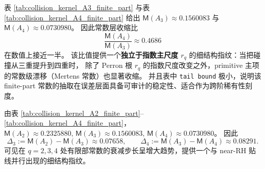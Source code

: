

\begin{remark}\label{rem:pom-collision-mertens-halving}
表 \ref{tab:collision_kernel_A3_finite_part} 与表 \ref{tab:collision_kernel_A4_finite_part} 给出
\(
\mathsf{M}(A_3)\approx 0.1560083
\)
与
\(
\mathsf{M}(A_4)\approx 0.0730980
\)。
因此常数层收缩比
\[
\boxed{\;
\frac{\mathsf{M}(A_4)}{\mathsf{M}(A_3)}\approx 0.4686\;}
\]
 在数值上接近一半。
该比值提供一个\textbf{独立于指数主尺度 \(r_q\)} 的细结构指纹：当把碰撞从三重提升到四重时，
除了 Perron 根 \(r_q\) 的指数尺度改变之外，primitive 主项的常数级漂移（Mertens 常数）也显著收缩。
并且表中 \texttt{tail bound} 极小，说明该 finite-part 常数的抽取在误差层面具备可审计的稳定性、适合作为跨阶稀有性刻度。
\end{remark}

\begin{remark}[有限部常数的步长加速（\(A_2\to A_4\)）]\label{rem:pom-collision-mertens-accel}
由表 \ref{tab:collision_kernel_A2_finite_part}--\ref{tab:collision_kernel_A4_finite_part}，
\(
\mathsf{M}(A_2)\approx 0.2325880,\,
\mathsf{M}(A_3)\approx 0.1560083,\,
\mathsf{M}(A_4)\approx 0.0730980
\)。
因此
\[
\Delta_3:=\mathsf{M}(A_2)-\mathsf{M}(A_3)\approx 0.07658,\qquad
\Delta_4:=\mathsf{M}(A_3)-\mathsf{M}(A_4)\approx 0.08291.
\]
可见在 \(q=2,3,4\) 处有限部常数的衰减步长呈增大趋势，提供一个与 near-RH 贴线并行出现的细结构指纹。
\end{remark}

